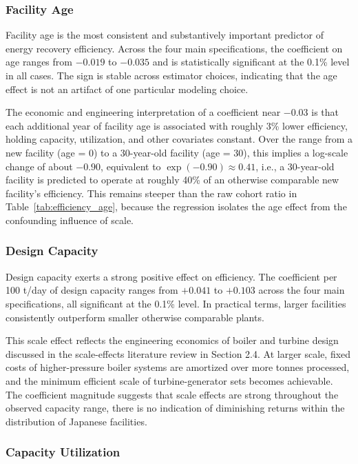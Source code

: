 \documentclass[12pt,a4paper]{article}
\begin{document}
\subsubsection{Facility Age}

Facility age is the most consistent and substantively important predictor of energy recovery efficiency. Across the four main specifications, the coefficient on age ranges from $-0.019$ to $-0.035$ and is statistically significant at the 0.1\% level in all cases. The sign is stable across estimator choices, indicating that the age effect is not an artifact of one particular modeling choice.

The economic and engineering interpretation of a coefficient near $-0.03$ is that each additional year of facility age is associated with roughly 3\% lower efficiency, holding capacity, utilization, and other covariates constant. Over the range from a new facility (age = 0) to a 30-year-old facility (age = 30), this implies a log-scale change of about $-0.90$, equivalent to $\exp(-0.90) \approx 0.41$, i.e., a 30-year-old facility is predicted to operate at roughly 40\% of an otherwise comparable new facility's efficiency. This remains steeper than the raw cohort ratio in Table~\ref{tab:efficiency_age}, because the regression isolates the age effect from the confounding influence of scale.

\subsubsection{Design Capacity}

Design capacity exerts a strong positive effect on efficiency. The coefficient per 100 t/day of design capacity ranges from $+0.041$ to $+0.103$ across the four main specifications, all significant at the 0.1\% level. In practical terms, larger facilities consistently outperform smaller otherwise comparable plants.

This scale effect reflects the engineering economics of boiler and turbine design discussed in the scale-effects literature review in Section 2.4. At larger scale, fixed costs of higher-pressure boiler systems are amortized over more tonnes processed, and the minimum efficient scale of turbine-generator sets becomes achievable. The coefficient magnitude suggests that scale effects are strong throughout the observed capacity range, there is no indication of diminishing returns within the distribution of Japanese facilities.

\subsubsection{Capacity Utilization}
\end{document}
